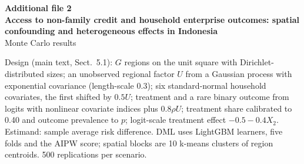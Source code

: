 \documentclass[11pt]{article}
\begin{document}
\noindent\textbf{Additional file 2}\\[2pt]
\textbf{Access to non-family credit and household enterprise outcomes: spatial confounding and heterogeneous effects in Indonesia}\\[2pt]
Monte Carlo results
\bigskip

\noindent Design (main text, Sect.~5.1): $G$ regions on the unit square with Dirichlet-distributed sizes; an unobserved regional factor $U$ from a Gaussian process with exponential covariance (length-scale 0.3); six standard-normal household covariates, the first shifted by $0.5U$; treatment and a rare binary outcome from logits with nonlinear covariate indices plus $0.8\rho U$; treatment share calibrated to 0.40 and outcome prevalence to $p$; logit-scale treatment effect $-0.5-0.4X_2$. Estimand: sample average risk difference. DML uses LightGBM learners, five folds and the AIPW score; spatial blocks are 10 k-means clusters of region centroids. 500 replications per scenario.


\end{document}
